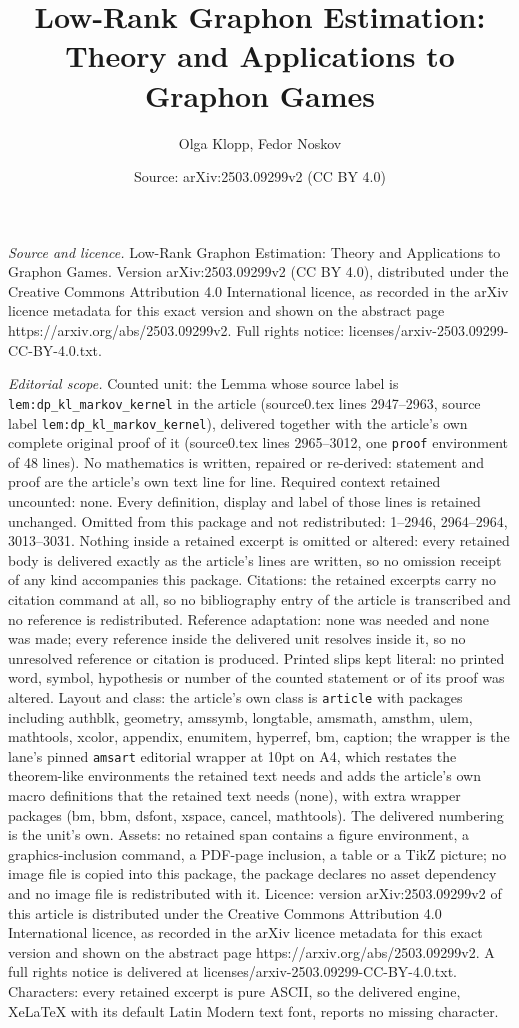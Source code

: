 \documentclass[10pt,a4paper]{amsart}
\title[Low-Rank Graphon Estimation: Theory and Applications to Grap]{Low-Rank Graphon Estimation: Theory and Applications to Graphon Games}
\author{Olga Klopp, Fedor Noskov}
\date{Source: arXiv:2503.09299v2 (CC BY 4.0)}
\begin{document}
\maketitle

\noindent\emph{Source and licence.} Low-Rank Graphon Estimation: Theory and Applications to Graphon Games. Version arXiv:2503.09299v2 (CC BY 4.0), distributed under the Creative Commons Attribution 4.0 International licence, as recorded in the arXiv licence metadata for this exact version and shown on the abstract page https://arxiv.org/abs/2503.09299v2. Full rights notice: licenses/arxiv-2503.09299-CC-BY-4.0.txt.\par\smallskip

\noindent\textit{Editorial scope.} Counted unit: the Lemma whose source label is \texttt{lem:dp\_kl\_markov\_kernel} in the article (source0.tex lines 2947--2963, source label \texttt{lem:dp\_kl\_markov\_kernel}), delivered together with the article's own complete original proof of it (source0.tex lines 2965--3012, one \texttt{proof} environment of 48 lines). No mathematics is written, repaired or re-derived: statement and proof are the article's own text line for line. Required context retained uncounted: none. Every definition, display and label of those lines is retained unchanged. Omitted from this package and not redistributed: 1--2946, 2964--2964, 3013--3031. Nothing inside a retained excerpt is omitted or altered: every retained body is delivered exactly as the article's lines are written, so no omission receipt of any kind accompanies this package. Citations: the retained excerpts carry no citation command at all, so no bibliography entry of the article is transcribed and no reference is redistributed. Reference adaptation: none was needed and none was made; every reference inside the delivered unit resolves inside it, so no unresolved reference or citation is produced. Printed slips kept literal: no printed word, symbol, hypothesis or number of the counted statement or of its proof was altered. Layout and class: the article's own class is \texttt{article} with packages including authblk, geometry, amssymb, longtable, amsmath, amsthm, ulem, mathtools, xcolor, appendix, enumitem, hyperref, bm, caption; the wrapper is the lane's pinned \texttt{amsart} editorial wrapper at 10pt on A4, which restates the theorem-like environments the retained text needs and adds the article's own macro definitions that the retained text needs (none), with extra wrapper packages (bm, bbm, dsfont, xspace, cancel, mathtools). The delivered numbering is the unit's own. Assets: no retained span contains a figure environment, a graphics-inclusion command, a PDF-page inclusion, a table or a TikZ picture; no image file is copied into this package, the package declares no asset dependency and no image file is redistributed with it. Licence: version arXiv:2503.09299v2 of this article is distributed under the Creative Commons Attribution 4.0 International licence, as recorded in the arXiv licence metadata for this exact version and shown on the abstract page https://arxiv.org/abs/2503.09299v2. A full rights notice is delivered at licenses/arxiv-2503.09299-CC-BY-4.0.txt. Characters: every retained excerpt is pure ASCII, so the delivered engine, XeLaTeX with its default Latin Modern text font, reports no missing character.
\end{document}
